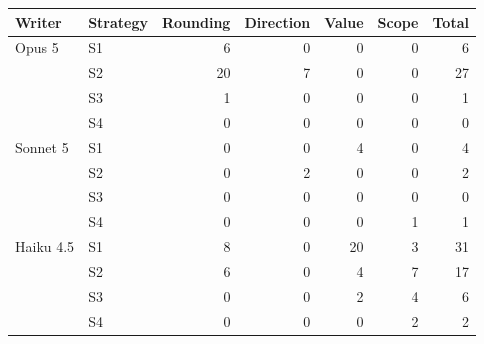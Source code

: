 \begin{tabular}{llrrrrr}
\toprule
Writer & Strategy & Rounding & Direction & Value & Scope & Total \\
\midrule
Opus 5 & S1 & 6 & 0 & 0 & 0 & 6 \\
 & S2 & 20 & 7 & 0 & 0 & 27 \\
 & S3 & 1 & 0 & 0 & 0 & 1 \\
 & S4 & 0 & 0 & 0 & 0 & 0 \\
\midrule
Sonnet 5 & S1 & 0 & 0 & 4 & 0 & 4 \\
 & S2 & 0 & 2 & 0 & 0 & 2 \\
 & S3 & 0 & 0 & 0 & 0 & 0 \\
 & S4 & 0 & 0 & 0 & 1 & 1 \\
\midrule
Haiku 4.5 & S1 & 8 & 0 & 20 & 3 & 31 \\
 & S2 & 6 & 0 & 4 & 7 & 17 \\
 & S3 & 0 & 0 & 2 & 4 & 6 \\
 & S4 & 0 & 0 & 0 & 2 & 2 \\
\bottomrule
\end{tabular}
